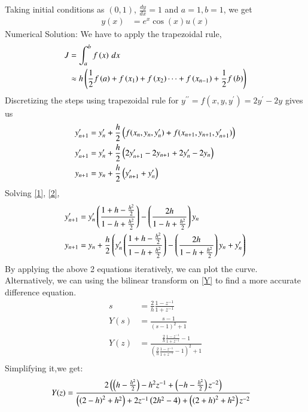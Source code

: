 \documentclass[journal]{IEEEtran}
\begin{document}
	Taking initial conditions as $(0,1)$, $\frac{dy}{dx} = 1$ and $a=1,b=1$, we get
		\begin{align}
					y(x) &= e^{x}\cos(x)u(x)
		\end{align}
	\newline
	Numerical Solution:\newline
	We have to apply the trapezoidal rule,
	\begin{align}
		J &= \int_a^b f\left(x\right)\, dx\\
		&\approx h\left(\frac{1}{2}f\left(a\right) + f\left(x_1\right) + f\left(x_2\right) \cdots + f\left(x_{n-1}\right) + \frac{1}{2}f\left(b\right)\right)\\
	\end{align}
	Discretizing the steps using trapezoidal rule for $y^{\prime\prime}  = f(x,y,y^\prime) = 2y^\prime - 2y$ gives us
	\begin{align}
		y^\prime_{n+1}  &= y^\prime_n + \frac{h}{2}\left(f(x_n,y_n,y_n^\prime) + f(x_{n+1},y_{n+1},y_{n+1}^\prime)\right) \\
		y^\prime_{n+1}  &= y^\prime_n + \frac{h}{2}\left( 2y^\prime_{n+1} - 2y_{n+1} + 2y^\prime_{n} - 2y_{n}\right) \label{1}\\
		y_{n+1}  &= y_n + \frac{h}{2}\left(y^\prime_{n+1} + y^\prime_n\right) \label{2}\\
	\end{align}
	Solving \eqref{1}, \eqref{2},
	\begin{align}
		y^\prime_{n+1}  &= y^\prime_n\left(\frac{1+ h - \frac{h^2}{2}}{1- h + \frac{h^2}{2}}\right) - \left(\frac{2h}{1- h + \frac{h^2}{2}}\right)y_n\\
		y_{n+1}  &= y_n + \frac{h}{2}\left(y^\prime_n\left(\frac{1+ h - \frac{h^2}{2}}{1- h + \frac{h^2}{2}}\right) - \left(\frac{2h}{1- h + \frac{h^2}{2}}\right)y_n + y^\prime_n\right) \label{2}\\
	\end{align}
	By applying the above 2 equations iteratively, we can plot the curve. \\
	Alternatively, we can using the bilinear transform on \eqref{Y} to find a more accurate difference equation.
	\begin{align}
		s &= \frac{2}{h} \frac{1-z^{-1}}{1+z^{-1}}\\
		Y(s) &= \frac{s - 1}{(s -1)^2 + 1} \\
		Y(z) &= \frac{\frac{2}{h} \frac{1-z^{-1}}{1+z^{-1}} - 1}{(\frac{2}{h} \frac{1-z^{-1}}{1+z^{-1}} -1)^2 + 1} \\
	\end{align}
	Simplifying it,we get:
		\begin{align}
		Y(z) &= \frac{2\left(\left(h - \frac{h^2}{2}\right) - h^2 z^{-1} + \left(-h - \frac{h^2}{2}\right)z^{-2}\right)}{\left(  \left(2-h\right)^2 + h^2\right) + 2z^{-1}\left(2h^2 - 4\right) + \left(  \left(2+h\right)^2 + h^2\right)z^{-2} }\end{align}
\end{document}
